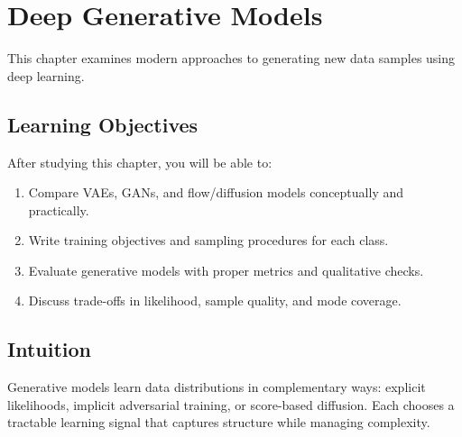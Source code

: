 
\chapter{Deep Generative Models}
\label{chap:deep-generative-models}

This chapter examines modern approaches to generating new data samples using deep learning.


\section*{Learning Objectives}

After studying this chapter, you will be able to:

\begin{enumerate}
    \item Compare VAEs, GANs, and flow/diffusion models conceptually and practically.
    \item Write training objectives and sampling procedures for each class.
    \item Evaluate generative models with proper metrics and qualitative checks.
    \item Discuss trade-offs in likelihood, sample quality, and mode coverage.
\end{enumerate}


\section*{Intuition}

Generative models learn data distributions in complementary ways: explicit likelihoods, implicit adversarial training, or score-based diffusion. Each chooses a tractable learning signal that captures structure while managing complexity.












